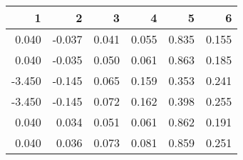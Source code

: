 \begin{table}[ht]
\centering
\begin{tabular}{rrrrrr}
  \hline
1 & 2 & 3 & 4 & 5 & 6 \\ 
  \hline
0.040 & -0.037 & 0.041 & 0.055 & 0.835 & 0.155 \\ 
  0.040 & -0.035 & 0.050 & 0.061 & 0.863 & 0.185 \\ 
  -3.450 & -0.145 & 0.065 & 0.159 & 0.353 & 0.241 \\ 
  -3.450 & -0.145 & 0.072 & 0.162 & 0.398 & 0.255 \\ 
  0.040 & 0.034 & 0.051 & 0.061 & 0.862 & 0.191 \\ 
  0.040 & 0.036 & 0.073 & 0.081 & 0.859 & 0.251 \\ 
   \hline
\end{tabular}
\end{table}

